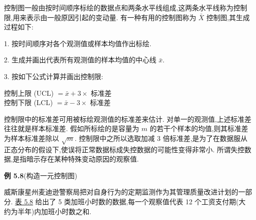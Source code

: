 控制图一般由按时间顺序标绘的数据点和两条水平线组成,这两条水平线称为控制限,用来表示由一般原因引起的变动量. 有一种有用的控制图称为 $\bar{X}$ 控制图,其生成过程如下:

1. 按时间顺序对各个观测值或样本均值作出标绘.

2. 生成并画出代表所有观测值的样本均值的中心线 $\bar{x}$.

3. 按如下公式计算并画出控制限:

\begin{center}
控制上限 (UCL) $=\bar{x}+3\times$ 标准差\\
控制下限 (LCL) $=\bar{x}-3\times$ 标准差
\end{center}

控制限中的标准差可用被标绘观测值的标准差来估计. 对单一的观测值,上述标准差往往就是样本标准差. 假如所标绘的是容量为 $m$ 的若干个样本的均值,则其标准差为样本标准差除以 $\sqrt{m}$. 控制限中之所以选取加减 3 倍标准差,是为了在数据服从正态分布的假设下,使误将正常数据标成失控数据的可能性变得非常小. 所谓失控数据,是指暗示存在某种特殊变动原因的观察值.

\noindent\textbf{例 5.8}\quad (构造一元控制图)

威斯康星州麦迪逊警察局把对自身行为的定期监测作为其管理质量改进计划的一部分. \hyperref[tab:5.8]{表 5.8} 给出了 5 类加班小时数的数据,每一个观察值代表 12 个工资支付期(大约为半年)内加班小时数之和.
